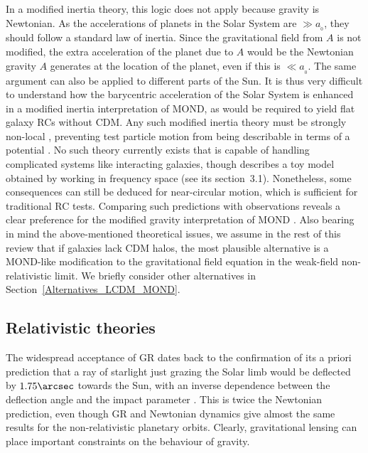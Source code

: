 \documentclass[fleqn,usenatbib,useAMS,onecolumn]{mnras} %
\begin{document}
In a modified inertia theory, this logic does not apply because gravity is Newtonian. As the accelerations of planets in the Solar System are $\gg a_{_0}$, they should follow a standard law of inertia. Since the gravitational field from $A$ is not modified, the extra acceleration of the planet due to $A$ would be the Newtonian gravity $A$ generates at the location of the planet, even if this is $\ll a_{_0}$. The same argument can also be applied to different parts of the Sun. It is thus very difficult to understand how the barycentric acceleration of the Solar System is enhanced in a modified inertia interpretation of MOND, as would be required to yield flat galaxy RCs without CDM. Any such modified inertia theory must be strongly non-local \citep{Milgrom_2011}, preventing test particle motion from being describable in terms of a potential \citep{Shariati_2021}. No such theory currently exists that is capable of handling complicated systems like interacting galaxies, though \citet{Milgrom_2011} describes a toy model obtained by working in frequency space (see its section~3.1). Nonetheless, some consequences can still be deduced for near-circular motion, which is sufficient for traditional RC tests. Comparing such predictions with observations reveals a clear preference for the modified gravity interpretation of MOND \citep{Petersen_2020}. Also bearing in mind the above-mentioned theoretical issues, we assume in the rest of this review that if galaxies lack CDM halos, the most plausible alternative is a MOND-like modification to the gravitational field equation in the weak-field non-relativistic limit. We briefly consider other alternatives in Section~\ref{Alternatives_LCDM_MOND}.



\subsection{Relativistic theories}
\label{Relativistic_MOND}

The widespread acceptance of GR dates back to the confirmation of its a priori prediction that a ray of starlight just grazing the Solar limb would be deflected by $1.75 \arcsec$ towards the Sun, with an inverse dependence between the deflection angle and the impact parameter \citep{Dyson_1920}. This is twice the Newtonian prediction, even though GR and Newtonian dynamics give almost the same results for the non-relativistic planetary orbits. Clearly, gravitational lensing can place important constraints on the behaviour of gravity.
\end{document}
